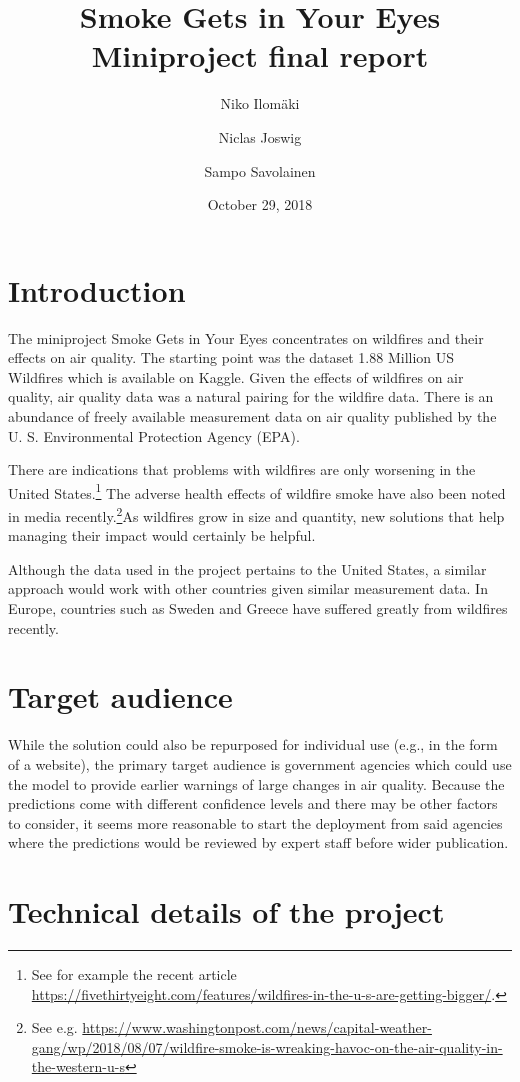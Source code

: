 \documentclass[a4paper,12pt]{article}
\title{\vspace*{-3cm}Smoke Gets in Your Eyes\\\Large{Miniproject final report}}
\author{Niko Ilomäki \and Niclas Joswig \and Sampo Savolainen}
\date{October 29, 2018}
\begin{document}
\maketitle

\section{Introduction}

The miniproject Smoke Gets in Your Eyes concentrates on wildfires and their effects on air quality. The starting point was the dataset 1.88 Million US Wildfires which is available on Kaggle. Given the effects of wildfires on air quality, air quality data was a natural pairing for the wildfire data. There is an abundance of freely available measurement data on air quality published by the U. S. Environmental Protection Agency (EPA).

There are indications that problems with wildfires are only worsening in the United States.\footnote{See for example the recent article \url{https://fivethirtyeight.com/features/wildfires-in-the-u-s-are-getting-bigger/}.} The adverse health effects of wildfire smoke have also been noted in media recently.\footnote{See e.g. \url{https://www.washingtonpost.com/news/capital-weather-gang/wp/2018/08/07/wildfire-smoke-is-wreaking-havoc-on-the-air-quality-in-the-western-u-s}}As wildfires grow in size and quantity, new solutions that help managing their impact would certainly be helpful.

Although the data used in the project pertains to the United States, a similar approach would work with other countries given similar measurement data. In Europe, countries such as Sweden and Greece have suffered greatly from wildfires recently.

\section{Target audience}

While the solution could also be repurposed for individual use (e.g., in the form of a website), the primary target audience is government agencies which could use the model to provide earlier warnings of large changes in air quality. Because the predictions come with different confidence levels and there may be other factors to consider, it seems more reasonable to start the deployment from said agencies where the predictions would be reviewed by expert staff before wider publication.

\section{Technical details of the project}
\end{document}
